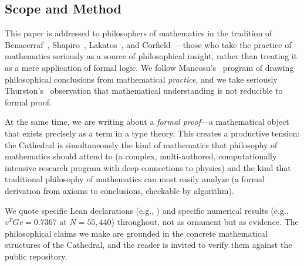 \subsection{Scope and Method}

This paper is addressed to philosophers of mathematics in the
tradition of Benacerraf~\cite{benacerraf1973},
Shapiro~\cite{shapiro1997}, Lakatos~\cite{lakatos1976}, and
Corfield~\cite{corfield2003}---those who take the practice of
mathematics seriously as a source of philosophical insight, rather
than treating it as a mere application of formal logic. We follow
Mancosu's~\cite{mancosu2008} program of drawing philosophical
conclusions from mathematical \emph{practice}, and we take seriously
Thurston's~\cite{thurston1994} observation that mathematical
understanding is not reducible to formal proof.

At the same time, we are writing about a \emph{formal proof}---a
mathematical object that exists precisely as a term in a type theory.
This creates a productive tension: the Cathedral is simultaneously
the kind of mathematics that philosophy of mathematics should attend
to (a complex, multi-authored, computationally intensive research
program with deep connections to physics) and the kind that
traditional philosophy of mathematics can most easily analyze
(a formal derivation from axioms to conclusions, checkable by
algorithm).

We quote specific Lean declarations (e.g., )
and specific numerical results (e.g., $v^TGv = 0.7367$ at $N = 55{,}440$)
throughout, not as ornament but as evidence. The philosophical claims
we make are grounded in the concrete mathematical structures of the
Cathedral, and the reader is invited to verify them against the
public repository.
